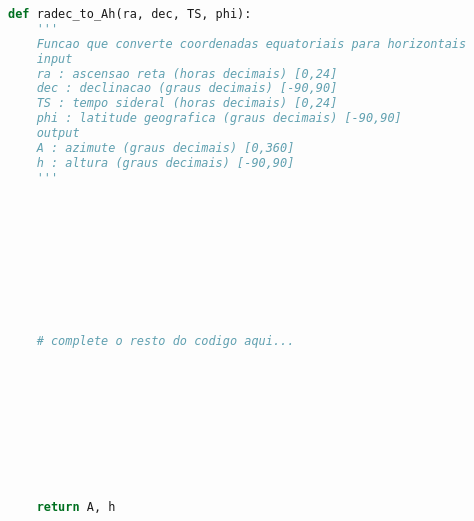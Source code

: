 \begin{lstlisting}[language=Python]
def radec_to_Ah(ra, dec, TS, phi):
    '''
    Funcao que converte coordenadas equatoriais para horizontais
    input
    ra : ascensao reta (horas decimais) [0,24]
    dec : declinacao (graus decimais) [-90,90]
    TS : tempo sideral (horas decimais) [0,24]
    phi : latitude geografica (graus decimais) [-90,90]
    output
    A : azimute (graus decimais) [0,360]
    h : altura (graus decimais) [-90,90]
    '''
    
    
    
    
    
    
    
    
    
    
    # complete o resto do codigo aqui...

    
    
    
    
    
    
    
    
    
    return A, h
\end{lstlisting}


